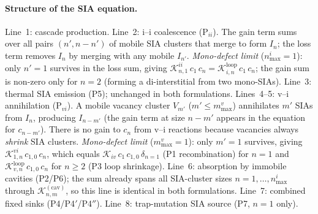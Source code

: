 \paragraph{Structure of the SIA equation.}
Line~1: cascade production.
Line~2: i--i coalescence (P$_{ii}$). The gain term sums over all pairs
$(n', n{-}n')$ of mobile SIA clusters that merge to form $I_n$; the loss
term removes $I_n$ by merging with any mobile $I_{n'}$.
\emph{Mono-defect limit} ($n_{\max}^i = 1$): only $n'=1$ survives in
the loss sum, giving $\mathcal{K}_{n,1}^{ii}\,c_1\,c_n =
\mathcal{K}_{i,n}^{\mathrm{loop}}\,c_1\,c_n$; the gain sum is
non-zero only for $n = 2$ (forming a di-interstitial from two
mono-SIAs).
Line~3: thermal SIA emission (P5); unchanged in both formulations.
Lines~4--5: v--i annihilation (P$_{vi}$). A mobile vacancy cluster
$V_{m'}$ ($m' \leq m_{\max}^v$) annihilates $m'$ SIAs from $I_n$,
producing $I_{n-m'}$ (the gain term at size $n-m'$ appears in the
equation for $c_{n-m'}$). There is no gain to $c_n$ from v--i
reactions because vacancies always \emph{shrink} SIA clusters.
\emph{Mono-defect limit} ($m_{\max}^v = 1$): only $m'=1$ survives,
giving $\mathcal{K}_{1,n}^{vi}\,c_{1,0}\,c_n$, which equals
$\mathcal{K}_{iv}\,c_1\,c_{1,0}\,\delta_{n=1}$ (P1 recombination) for
$n=1$ and $\mathcal{K}_{v,n}^{\mathrm{loop}}\,c_{1,0}\,c_n$ for $n\geq 2$
(P3 loop shrinkage).
Line~6: absorption by immobile cavities (P2/P6); the sum already spans
all SIA-cluster sizes $n = 1,\ldots,n_{\max}^i$ through
$\mathcal{K}_{n,m}^{(\mathrm{cav})}$, so this line is identical in both
formulations.
Line~7: combined fixed sinks (P4/P4$'$/P4$''$).
Line~8: trap-mutation SIA source (P7, $n=1$ only).

